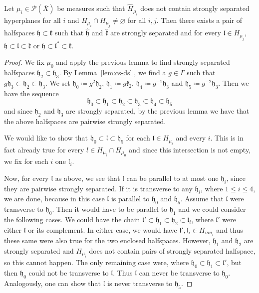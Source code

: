 \begin{lemma}[{\cite[Lemma~4.20]{MR3509968}}]
  \label{lem:4.20}
  Let \(\mu_i \in \mathcal{P}(\bar X)\) be measures such that \(\hat H_{\mu_i}\) does not contain strongly separated hyperplanes for all \(i\) and \(H_{\mu_i} \cap H_{\mu_j} \neq \varnothing\) for all \(i,j\). Then there exists a pair of halfspaces \(\mathfrak{h} \subset \mathfrak{k}\) such that \(\mathfrak{\hat h}\) and \(\mathfrak{\hat k}\) are strongly separated and for every \(\mathfrak{l} \in H_{\mu_j}\), \(\mathfrak{h} \subset \mathfrak{l} \subset \mathfrak{k}\) or \(\mathfrak{h} \subset \mathfrak{l}^\ast \subset \mathfrak{k}\).
\end{lemma}

\begin{proof}
  We fix \(\mu_0\) and apply the previous lemma to find strongly separated halfspaces \(\mathfrak{h_2} \subset \mathfrak{h_3}\). By Lemma~\ref{lem:cs-dsl}, we find a \(g \in \Gamma\) such that \(g\mathfrak{h}_3 \subset \mathfrak{h}_2 \subset \mathfrak{h}_3\). We set \(\mathfrak{h}_0 \coloneqq g^2 \mathfrak{h}_2\), \(\mathfrak{h}_1 \coloneqq g\mathfrak{k}_2\), \(\mathfrak{h}_4 \coloneqq g^{-1}\mathfrak{h}_3\) and \(\mathfrak{h}_5 \coloneqq g^{-2} \mathfrak{h}_3\). Then we have the sequence
  \[
    \mathfrak{h}_0 \subset \mathfrak{h}_1 \subset \mathfrak{h}_2 \subset \mathfrak{h}_3 \subset \mathfrak{h}_4 \subset \mathfrak{h}_5
  \]
  and since \(\mathfrak{h}_2\) and \(\mathfrak{h}_3\) are strongly separated, by the previous lemma we have that the above halfspaces are pairwise strongly separated.

  We would like to show that \(\mathfrak{h}_0 \subset \mathfrak{l} \subset \mathfrak{h}_5\) for each \(\mathfrak{l} \in H_{\mu_i}\) and every \(i\). This is in fact already true for every \(l \in H_{\mu_i} \cap H_{\mu_0}\) and since this intersection is not empty, we fix for each \(i\) one \(\mathfrak{l}_i\).

  Now, for every \(\mathfrak{l}\) as above, we see that \(\mathfrak{l}\) can be parallel to at most one \(\mathfrak{h}_i\), since they are pairwise strongly separated. If it is transverse to any \(\mathfrak{h}_i\), where \(1 \leq i \leq 4\), we are done, because in this case \(\mathfrak{l}\) is parallel to \(\mathfrak{h}_0\) and \(\mathfrak{h}_5\). Assume that \(\mathfrak{l}\) were transverse to \(\mathfrak{h}_0\). Then it would have to be parallel to \(\mathfrak{h}_1\) and we could consider the following cases. We could have the chain \(\mathfrak{l}' \subset \mathfrak{h}_1 \subset \mathfrak{h}_2 \subset \mathfrak{l}_i\), where \(\mathfrak{l}'\) were either \(\mathfrak{l}\) or its complement. In either case, we would have \(\mathfrak{l}', \mathfrak{l}_i \in H_{mu_i}\) and thus these same were also true for the two enclosed halfspaces. However, \(\mathfrak{h}_1\) and \(\mathfrak{h}_2\) are strongly separated and \(H_{\mu_i}\) does not contain pairs of strongly separated halfspace, so this cannot happen. The only remaining case were, where \(\mathfrak{h_0} \subset \mathfrak{h}_1 \subset \mathfrak{l}'\), but then \(\mathfrak{h}_0\) could not be transverse to \(\mathfrak{l}\). Thus \(\mathfrak{l}\) can never be transverse to \(\mathfrak{h}_0\). Analogously, one can show that \(\mathfrak{l}\) is never transverse to \(\mathfrak{h}_5\).


\end{proof}
